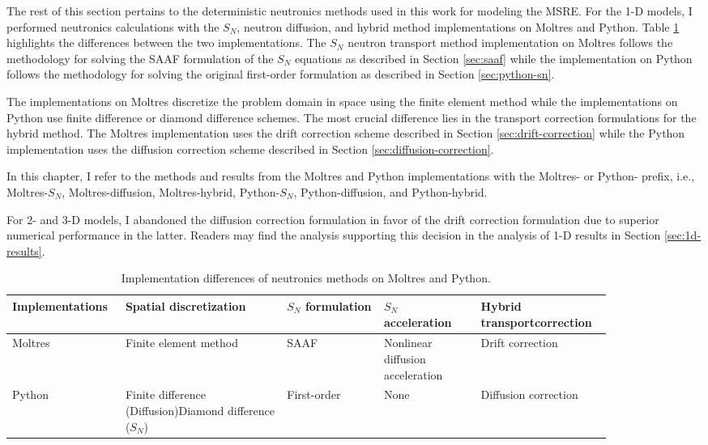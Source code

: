 The rest of this section pertains to the deterministic neutronics methods used in this work for
modeling the \gls{MSRE}.
For the 1-D models, I performed neutronics calculations with the $S_N$, neutron diffusion, and
hybrid method implementations on Moltres and Python. Table \ref{table:nts-methods} highlights the
differences between the two implementations. The $S_N$ neutron transport method implementation on
Moltres follows the methodology for solving the \gls{SAAF} formulation of the $S_N$ equations as
described in Section \ref{sec:saaf} while the implementation on Python follows the methodology
for solving the original first-order formulation as described in Section \ref{sec:python-sn}.

The implementations on Moltres discretize the problem domain in space using the finite element
method while the implementations on Python use finite difference or diamond difference schemes. The
most crucial difference lies in the transport correction formulations for the hybrid method. The
Moltres implementation uses the drift correction scheme described in Section
\ref{sec:drift-correction} while the Python implementation uses the diffusion correction
scheme described in Section \ref{sec:diffusion-correction}.

In this chapter, I refer to the methods and results from the Moltres and Python implementations
with the Moltres- or Python- prefix, i.e., Moltres-$S_N$, Moltres-diffusion, Moltres-hybrid,
Python-$S_N$, Python-diffusion, and Python-hybrid.

For 2- and 3-D models, I abandoned the diffusion correction formulation in favor of the drift
correction formulation due to superior numerical performance in the latter. Readers may find the
analysis supporting this decision in the analysis of 1-D results in Section \ref{sec:1d-results}.

\begin{table}[htb!]
  \centering
  \footnotesize
  \caption{Implementation differences of neutronics methods on Moltres and Python.}
  \begin{tabular}{p{0.14\linewidth} p{0.25\linewidth} p{0.15\linewidth} p{0.15\linewidth} p{0.17\linewidth}}
    \toprule
    Implementations & Spatial discretization & $S_N$ formulation & $S_N$ acceleration &
    Hybrid transport\newline correction \\
    \midrule
    Moltres & Finite element method & SAAF & Nonlinear diffusion acceleration & Drift correction \\
    Python & Finite difference (Diffusion)\newline Diamond difference ($S_N$) & First-order & None & Diffusion correction \\
    \bottomrule
  \end{tabular}
  \label{table:nts-methods}
\end{table}

